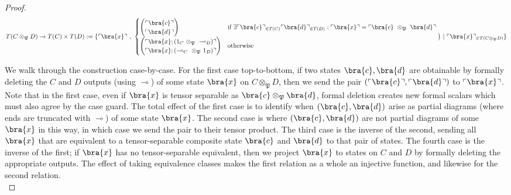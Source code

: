 \begin{fullwidth}
\begin{theorem}
\begin{proof}
\[T(C \otimes_\mathfrak{P} D) \rightarrow T(C) \times T(D) := \{ \ulcorner \bra{x} \urcorner \ , \ \begin{cases} \begin{pmatrix} \ulcorner \bra{c} \urcorner \\ \ulcorner \bra{d} \urcorner \end{pmatrix} & \text{if }\exists \ulcorner \bra{c} \urcorner_{\in T(C)} \ulcorner \bra{d} \urcorner_{\in T(D)}: \ulcorner \bra{x} \urcorner = \ulcorner \bra{c} \ \otimes_\mathfrak{P} \ \bra{d} \urcorner \\ \begin{pmatrix} \ulcorner \bra{x};(1_C \ \otimes_\mathfrak{P} \ \multimap_D) \urcorner \\ \ulcorner \bra{x};(\multimap_C \ \otimes_\mathfrak{P} \ 1_D) \urcorner \end{pmatrix} & \text{otherwise} \end{cases} \big) \ | \ \ulcorner \bra{x} \urcorner_{\in T(C \otimes_\mathfrak{P} D)} \}\]

We walk through the construction case-by-case. For the first case top-to-bottom, if two states $\bra{c},\bra{d}$ are obtainable by formally deleting the $C$ and $D$ outputs (using $\multimap$) of some state $\bra{x}$ on $C \otimes_\mathfrak{P} D$, then we send the pair $(\ulcorner \bra{c} \urcorner,\ulcorner \bra{d} \urcorner)$ to $\ulcorner \bra{x} \urcorner$. Note that in the first case, even if $\bra{x}$ is tensor separable as $\bra{c} \otimes_\mathfrak{P} \bra{d}$, formal deletion creates new formal scalars which must also agree by the case guard. The total effect of the first case is to identify when $(\bra{c},\bra{d})$ arise as partial diagrams (where ends are truncated with $\multimap$) of some state $\bra{x}$. The second case is where $(\bra{c},\bra{d})$ are not partial diagrams of some $\bra{x}$ in this way, in which case we send the pair to their tensor product. The third case is the inverse of the second, sending all $\bra{x}$ that are equivalent to a tensor-separable composite state $\bra{c}$ and $\bra{d}$ to that pair of states. The fourth case is the inverse of the first; if $\bra{x}$ has no tensor-separable equivalent, then we project $\bra{x}$ to states on $C$ and $D$ by formally deleting the appropriate outputs. The effect of taking equivalence classes makes the first relation as a whole an injective function, and likewise for the second relation.\\


\end{proof}
\end{theorem}
\end{fullwidth}
